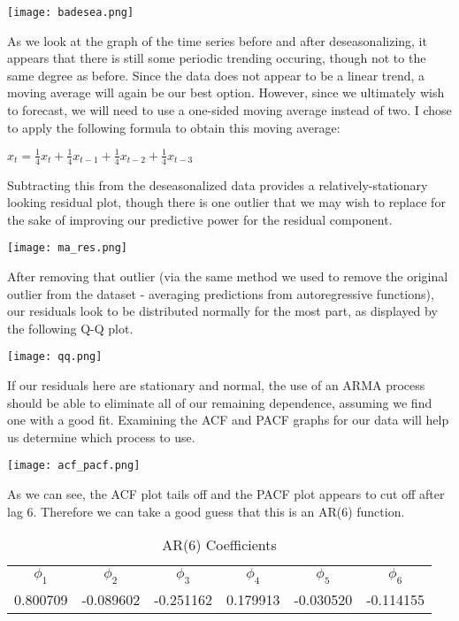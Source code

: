 \documentclass[twoside,12pt]{article}
\begin{document}
\begin{center}
\texttt{[image: badesea.png]}
\end{center}
As we look at the graph of the time series before and after deseasonalizing, it appears that there is still some periodic trending occuring, though not to the same degree as before. Since the data does not appear to be a linear trend, a moving average will again be our best option. However, since we ultimately wish to forecast, we will need to use a one-sided moving average instead of two. I chose to apply the following formula to obtain this moving average: \begin{center}$\hat x_{t} =  \frac{1}{4}x_{t}+\frac{1}{4}x_{t-1}+\frac{1}{4}x_{t-2}+\frac{1}{4}x_{t-3}$\end{center}
Subtracting this from the deseasonalized data provides a relatively-stationary looking residual plot, though there is one outlier that we may wish to replace for the sake of improving our predictive power for the residual component.
\begin{center}
\texttt{[image: ma\_res.png]}
\end{center}
After removing that outlier (via the same method we used to remove the original outlier from the dataset - averaging predictions from autoregressive functions), our residuals look to be distributed normally for the most part, as displayed by the following Q-Q plot.
\begin{center}
\texttt{[image: qq.png]}
\end{center}
If our residuals here are stationary and normal, the use of an ARMA process should be able to eliminate all of our remaining dependence, assuming we find one with a good fit. Examining the ACF and PACF graphs for our data will help us determine which process to use.
\begin{center}
\texttt{[image: acf\_pacf.png]}
\end{center}
As we can see, the ACF plot tails off and the PACF plot appears to cut off after lag 6. Therefore we can take a good guess that this is an AR(6) function. 
\begin{table}[ht]
\centering
\begin{tabular}{cccccc}
  \hline
  $\phi_{1}$ & $\phi_{2}$ & $\phi_{3}$ & $\phi_{4}$ & $\phi_{5}$ & $\phi_{6}$ \\
  0.800709 & -0.089602 & -0.251162 & 0.179913 & -0.030520 & -0.114155 \\
   \hline
\end{tabular}
\caption{AR(6) Coefficients}
\end{table} 
\end{document}
